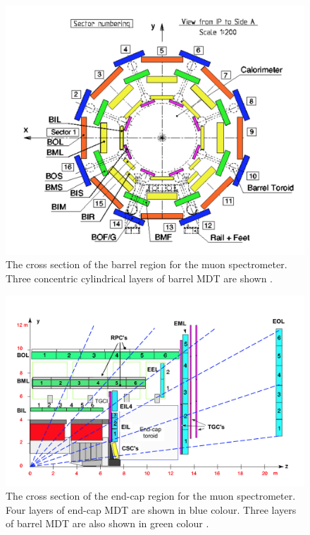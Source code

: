 \begin{figure}
\centering
\includegraphics[width=\textwidth]{data/photo/detector/muon_barrel.png}
\caption{The cross section of the barrel region for the muon spectrometer. Three concentric cylindrical layers of barrel MDT are shown \cite{ATLAS_doc}.}
\label{fig:muon_barrel}
\end{figure}

\begin{figure}
\centering
\includegraphics[width=\textwidth]{data/photo/detector/muon_endcap.png}
\caption{The cross section of the end-cap region for the muon spectrometer. Four layers of end-cap MDT are shown in blue colour. Three layers of barrel MDT are also shown in green colour \cite{ATLAS_doc}.}
\label{fig:muon_endcap}
\end{figure}

